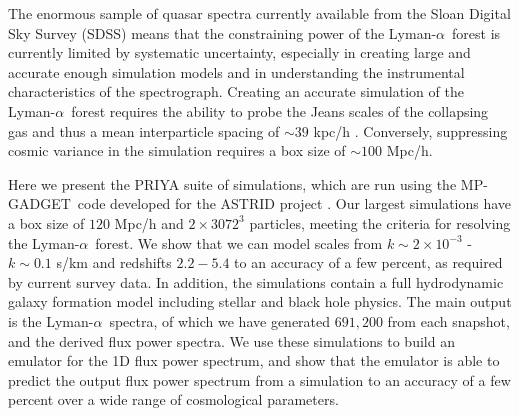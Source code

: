 \documentclass[a4paper,11pt]{article}
\newcommand{\Lya}{Lyman-$\alpha$}
\newcommand{\mpgadget}{{\small MP-GADGET}}
\begin{document}
The enormous sample of quasar spectra currently available from the Sloan Digital Sky Survey (SDSS) means that the constraining power of the \Lya~forest is currently limited by systematic uncertainty, especially in creating large and accurate enough simulation models and in understanding the instrumental characteristics of the spectrograph.
Creating an accurate simulation of the \Lya~forest requires the ability to probe the Jeans scales of the collapsing gas and thus a mean interparticle spacing of $\sim 39$ kpc/h \cite{Borde:2014}. Conversely, suppressing cosmic variance in the simulation requires a box size of $\sim 100$ Mpc/h.

Here we present the PRIYA suite of simulations, which are run using the \mpgadget~code developed for the ASTRID project \cite{Ni:2021, Bird:2022}. Our largest simulations have a box size of $120$ Mpc/h and $2\times 3072^3$ particles, meeting the criteria for resolving the \Lya~forest.
We show that we can model scales from $k \sim 2\times 10^{-3}$ - $k \sim 0.1$ s/km and redshifts $2.2 - 5.4$ to an accuracy of a few percent, as required by current survey data. In addition, the simulations contain a full hydrodynamic galaxy formation model including stellar and black hole physics. The main output is the \Lya~spectra, of which we have generated $691,200$ from each snapshot, and the derived flux power spectra.
We use these simulations to build an emulator for the 1D flux power spectrum, and show that the emulator is able to predict the output flux power spectrum from a simulation to an accuracy of a few percent over a wide range of cosmological parameters.
\end{document}
